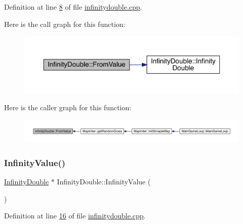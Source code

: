 Definition at line \hyperlink{a00056_source_l00008}{8} of file \hyperlink{a00056_source}{infinitydouble.\+cpp}.

Here is the call graph for this function\+:
\nopagebreak
\begin{figure}[H]
\begin{center}
\leavevmode
\includegraphics[width=350pt]{d6/d7d/a00161_adb0a2fa93aa5f90a93c3f4303436913a_cgraph}
\end{center}
\end{figure}
Here is the caller graph for this function\+:
\nopagebreak
\begin{figure}[H]
\begin{center}
\leavevmode
\includegraphics[width=350pt]{d6/d7d/a00161_adb0a2fa93aa5f90a93c3f4303436913a_icgraph}
\end{center}
\end{figure}
\mbox{\label{a00161_a67fae871f96708313bedc644630ac8bc}} 
\subsubsection{\texorpdfstring{Infinity\+Value()}{InfinityValue()}}
{\footnotesize\ttfamily \hyperlink{a00161}{Infinity\+Double} $\ast$ Infinity\+Double\+::\+Infinity\+Value (\begin{DoxyParamCaption}{ }\end{DoxyParamCaption})\hspace{0.3cm}{\ttfamily [static]}}



Definition at line \hyperlink{a00056_source_l00016}{16} of file \hyperlink{a00056_source}{infinitydouble.\+cpp}.


